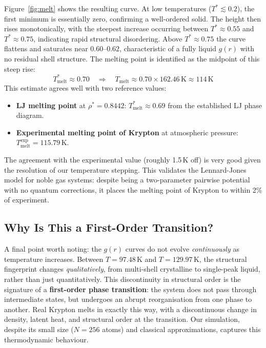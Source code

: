 Figure~\ref{fig:melt} shows the resulting curve. At low temperatures ($T^* \lesssim 0.2$), the first minimum is essentially zero, confirming a well-ordered solid. The height then rises monotonically, with the steepest increase occurring between $T^* \approx 0.55$ and $T^* \approx 0.75$, indicating rapid structural disordering. Above $T^* \approx 0.75$ the curve flattens and saturates near $0.60$--$0.62$, characteristic of a fully liquid $g(r)$ with no residual shell structure. The melting point is identified as the midpoint of this steep rise:
\begin{equation}
    T^*_\text{melt} \approx 0.70 \quad \Rightarrow \quad
    T_\text{melt} \approx 0.70 \times 162.46\,\text{K} \approx 114\,\text{K}
    \label{eq:melt_est}
\end{equation}
This estimate agrees well with two reference values:
\begin{itemize}
    \item \textbf{LJ melting point} at $\rho^* = 0.8442$: $T^*_\text{melt} \approx 0.69$ from the established LJ phase diagram.
    \item \textbf{Experimental melting point of Krypton} at atmospheric pressure: $T_\text{melt}^\text{exp} = 115.79$\,K.
\end{itemize}
The agreement with the experimental value (roughly 1.5\,K off) is very good given the resolution of our temperature stepping. This validates the Lennard-Jones model for noble gas systems: despite being a two-parameter pairwise potential with no quantum corrections, it places the melting point of Krypton to within 2\% of experiment.


\subsection{Why Is This a First-Order Transition?}

A final point worth noting: the $g(r)$ curves do not evolve \emph{continuously} as temperature increases. Between $T = 97.48$\,K and $T = 129.97$\,K, the structural fingerprint changes \emph{qualitatively}, from multi-shell crystalline to single-peak liquid, rather than just quantitatively. This discontinuity in structural order is the signature of a \textbf{first-order phase transition}: the system does not pass through intermediate states, but undergoes an abrupt reorganisation from one phase to another. Real Krypton melts in exactly this way, with a discontinuous change in density, latent heat, and structural order at the transition. Our simulation, despite its small size ($N = 256$ atoms) and classical approximations, captures this thermodynamic behaviour.